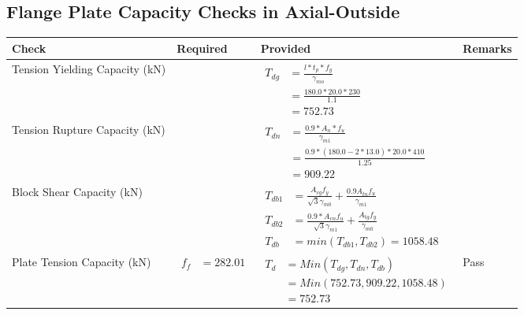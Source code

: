 \documentclass{article}%
\begin{document}
\subsection{Flange Plate Capacity Checks in Axial{-}Outside }%
\label{subsec:FlangePlateCapacityChecksinAxial{-}Outside}%
\renewcommand{\arraystretch}{1.2}%
\begin{longtable}{|p{4cm}|p{6cm}|p{5.5cm}|p{1.5cm}|}%
\hline%
\rowcolor{OsdagGreen}%
Check&Required&Provided&Remarks\\%
\hline%
\endhead%
\hline%
Tension Yielding Capacity (kN)&&$\begin{aligned} T_{dg} &= \frac{l*t_p*f_y}{\gamma_{mo}}\\ &=\frac{180.0*20.0*230}{1.1}\\ &=752.73\end{aligned}$&\\%
\hline%
Tension Rupture Capacity (kN)&&$\begin{aligned} T_{dn} &= \frac{0.9*A_{n}*f_u}{\gamma_{m1}}\\ &=\frac{0.9*(180.0-2*13.0)*20.0*410}{1.25}\\ &=909.22\end{aligned}$&\\%
\hline%
Block Shear Capacity (kN)&&$\begin{aligned}T_{db1} &= \frac{A_{vg} f_{y}}{\sqrt{3} \gamma_{m0}} + \frac{0.9 A_{tn} f_{u}}{\gamma_{m1}}\\ T_{db2} &= \frac{0.9*A_{vn} f_{u}}{\sqrt{3} \gamma_{m1}} + \frac{A_{tg} f_{y}}{\gamma_{m0}}\\ T_{db} &= min(T_{db1}, T_{db2})= 1058.48\end{aligned}$&\\%
\hline%
Plate Tension Capacity (kN)&$\begin{aligned} f_f &=282.01 \end{aligned}$&$\begin{aligned} T_d &= Min(T_{dg},T_{dn},T_{db})\\ &= Min(752.73,909.22,1058.48)\\ &=752.73\end{aligned}$&Pass\\%
\hline%
\end{longtable}

%
\newpage%
\end{document}
